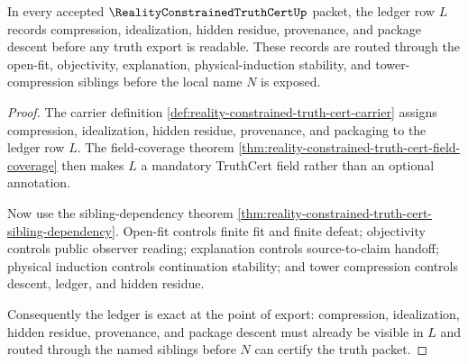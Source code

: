 \begin{theorem}
\label{thm:reality-constrained-truth-cert-ledger-exactness}
In every accepted $\RealityConstrainedTruthCertUp$ packet, the ledger row $L$
records compression, idealization, hidden residue, provenance, and package
descent before any truth export is readable. These records are routed through
the open-fit, objectivity, explanation, physical-induction stability, and
tower-compression siblings before the local name $N$ is exposed.
\end{theorem}
\begin{proof}
The carrier definition
\autoref{def:reality-constrained-truth-cert-carrier} assigns compression,
idealization, hidden residue, provenance, and packaging to the ledger row $L$.
The field-coverage theorem
\autoref{thm:reality-constrained-truth-cert-field-coverage} then makes $L$ a
mandatory TruthCert field rather than an optional annotation.

Now use the sibling-dependency theorem
\autoref{thm:reality-constrained-truth-cert-sibling-dependency}. Open-fit
controls finite fit and finite defeat; objectivity controls public observer
reading; explanation controls source-to-claim handoff; physical induction
controls continuation stability; and tower compression controls descent,
ledger, and hidden residue.

Consequently the ledger is exact at the point of export: compression,
idealization, hidden residue, provenance, and package descent must already be
visible in $L$ and routed through the named siblings before $N$ can certify the
truth packet.
\end{proof}

